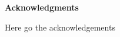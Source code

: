 \newpage
\thispagestyle{plain} 
\vspace*{1cm}
\begin{center}
\textbf{Acknowledgments}
\end{center}
\vspace{1cm}

Here go the acknowledgements